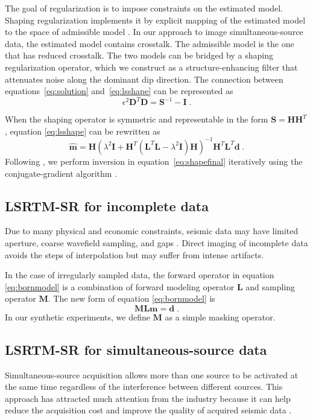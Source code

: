 The goal of regularization is to impose constraints on the estimated model.
Shaping regularization implements it by explicit mapping of the estimated model to the space of admissible model \cite[]{sergeyshape1,xue15}.
In our approach to image simultaneous-source data, the estimated model contains crosstalk.
The admissible model is the one that has reduced crosstalk.
The two models can be bridged by a shaping regularization operator, which we construct as a structure-enhancing filter
that attenuates noise along the dominant dip direction.
The connection between equations~\ref{eq:solution} and~\ref{eq:lsshape} can be represented as
\begin{equation}
\label{eq:connection}
{\epsilon}^2 \mathbf{D}^T \mathbf{D}={\mathbf{S}}^{-1}-\mathbf{I} \; .
\end{equation}

When the shaping operator is symmetric and representable in the form $\mathbf{S}=\mathbf{HH}^T$, 
equation \ref{eq:lsshape} can be rewritten as
\begin{equation}
\label{eq:shapefinal}
\hat{\mathbf{m}} = \mathbf{H} (\lambda^2\mathbf{I} + \mathbf{H}^T(\mathbf{L}^T\mathbf{L}-\lambda^2\mathbf{I})\mathbf{H} )^{-1}\mathbf{H}^T\mathbf{L}^T\mathbf{d} \; .
\end{equation}
Following \cite{sergeyshape1}, we perform inversion in equation~\ref{eq:shapefinal} iteratively using the conjugate-gradient algorithm \cite[]{hestenes52}.

\subsection{LSRTM-SR for incomplete data}
Due to many physical and economic constraints, seismic data may have limited aperture, coarse wavefield sampling, and gaps \cite[]{nemeth}. 
Direct imaging of incomplete data avoids the steps of interpolation but may suffer from intense artifacts.

In the case of irregularly sampled data, the forward operator in equation \ref{eq:bornmodel} is a combination of forward modeling operator $\mathbf{L}$ and sampling operator $\mathbf{M}$. The new form of equation \ref{eq:bornmodel} is
\begin{equation}
\label{eq:mask}
\mathbf{MLm}=\mathbf{d} \; .
\end{equation}
In our synthetic experiments, we define $\mathbf{M}$ as a simple masking operator.

\subsection{LSRTM-SR for simultaneous-source data}
Simultaneous-source acquisition allows more than one source to be activated at the same time 
regardless of the interference between different sources. 
This approach has attracted much attention from the industry 
because it can help reduce the acquisition cost and improve the quality of acquired seismic data \cite[]{berkhout}. 

